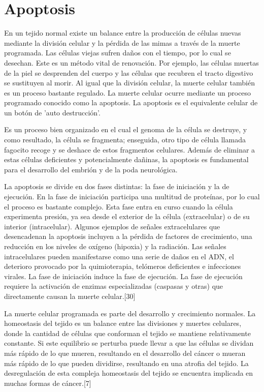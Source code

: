 \section{Apoptosis}
\hspace{.1cm}En un tejido normal existe un balance entre la producción de células nuevas mediante la división celular y la pérdida de las mimas a través de la muerte programada. Las células viejas sufren daños con el tiempo, por lo cual se desechan. Este es un método vital de renovación. Por ejemplo, las células muertas de la piel se desprenden del cuerpo y las células que recubren el tracto digestivo se sustituyen al morir. Al igual que la división celular, la muerte celular también es un proceso bastante regulado. La muerte celular ocurre mediante un proceso programado conocido como la apoptosis. La apoptosis es el equivalente celular de un botón de 'auto destrucción'.

\hspace{.1cm}Es un proceso bien organizado en el cual el genoma de la célula se destruye, y como resultado, la célula se fragmenta; enseguida, otro tipo de célula llamada fagocito recoge y se deshace de estos fragmentos celulares. Además de eliminar a estas células deficientes y potencialmente dañinas, la apoptosis es fundamental para el desarrollo del embrión y de la poda neurológica.

\hspace{.1cm}La apoptosis se divide en dos fases distintas: la fase de iniciación y la de ejecución. En la fase de iniciación participa una multitud de proteínas, por lo cual el proceso es bastante complejo. Esta fase entra en curso cuando la célula experimenta presión, ya sea desde el exterior de la célula (extracelular) o de su interior (intracelular). Algunos ejemplos de señales extracelulares que desencadenan la apoptosis incluyen a la pérdida de factores de crecimiento, una reducción en los niveles de oxígeno (hipoxia) y la radiación. Las señales intracelulares pueden manifestarse como una serie de daños en el ADN, el deterioro provocado por la quimioterapia, telómeros deficientes e infecciones virales. La fase de iniciación induce la fase de ejecución. La fase de ejecución requiere la activación de enzimas especializadas (caspasas y otras) que directamente causan la muerte celular.[30]

\hspace{.1cm}La muerte celular programada es parte del desarrollo y crecimiento normales. La homeostasis del tejido es un balance entre las divisiones y muertes celulares, donde la cantidad de células que conforman el tejido se mantiene relativamente constante. Si este equilibrio se perturba puede llevar a que las células se dividan más rápido de lo que mueren, resultando en el desarrollo del cáncer o mueran más rápido de lo que pueden dividirse, resultando en una atrofia del tejido. La desregulación de esta compleja homeostasis del tejido se encuentra implicada en muchas formas de cáncer.[7]

